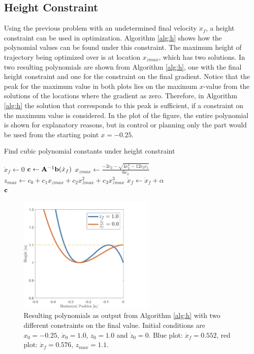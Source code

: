 \subsection{Height Constraint}
Using the previous problem with an undetermined final velocity $\dot{x}_f$, a height constraint can be used in optimization. Algorithm \ref{alg:h} shows how the polynomial values can be found under this constraint. The maximum height of trajectory being optimized over is at location $x_{zmax}$, which has two solutions. In  two resulting polynomials are shown from Algorithm \ref{alg:h}, one with the final height constraint and one for the constraint on the final gradient. Notice that the peak for the maximum value in both plots lies on the maximum $x$-value from the solutions of the locations where the gradient as zero. Therefore, in Algorithm \ref{alg:h} the solution that corresponds to this peak is sufficient, if a constraint on the maximum value is considered. In the plot of the figure, the entire polynomial is shown for explanatory reasons, but in control or planning only the part would be used from the starting point $x=-0.25$.
\begin{algorithm}
\caption{Find cubic polynomial constants under height constraint}
\label{alg:h}
\begin{algorithmic}[1]
    \State $\dot{x}_{f}\gets 0$
        \Repeat
            \State $\mathbf{c}\gets \mathbf{A}^{-1}\mathbf{b}(\dot{x}_{f})$ 
            \State $x_{zmax}\gets \frac{-2c_2 - \sqrt{4c_2^2-12c_3c_1}}{6c_3}$ 
            \State $z_{max} \gets c_0 + c_1x_{zmax} + c_2x_{zmax}^2+ c_3x_{zmax}^3$ 
            \State $\dot{x}_{f} \gets \dot{x}_{f}+\alpha$   
        \\
    \Return $\mathbf{c}$
\end{algorithmic}
\end{algorithm}
\begin{figure}[h]
\centering
\includegraphics[width=0.6\textwidth]{STYLESTUFF/polynomialHeightViz.png}
\caption{Resulting polynomials as output from Algorithm \ref{alg:h} with two different constraints on the final value. Initial conditions are $x_0=-0.25$, $\dot{x}_0=1.0$, $z_0=1.0$ and $\dot{z}_0=0$. Blue plot: $\dot{x}_f=0.552$, red plot: $\dot{x}_f=0.576$, $z_{max}=1.1$. }
\label{fig:polheight}
\end{figure}


